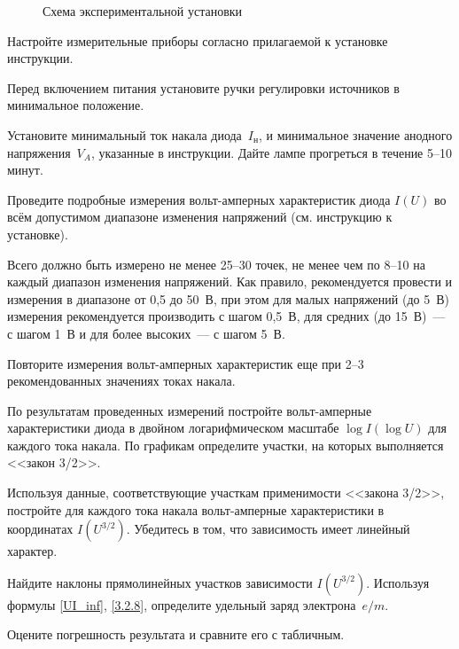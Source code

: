 \begin{figure}[h!]
    \centering
    \caption{Схема экспериментальной установки}
\end{figure}

\begin{lab:task}



    
\item Настройте измерительные приборы согласно прилагаемой к установке
инструкции.

\item Перед включением питания установите ручки регулировки источников
в минимальное положение.

\item Установите минимальный ток накала диода~$I_\text{н}$, 
и минимальное значение анодного напряжения~$V_{A}$, 
указанные в инструкции. Дайте лампе прогреться в течение 5--10 минут.

\item Проведите подробные измерения вольт-амперных характеристик диода 
$I(U)$ во всём допустимом диапазоне изменения напряжений  (см. инструкцию
к установке). 

Всего должно быть измерено не менее 25--30 точек, 
не менее чем по 8--10 на каждый диапазон изменения напряжений. 
Как правило, рекомендуется провести и измерения в диапазоне от 0,5 до 50~В, 
при этом для малых напряжений (до 5~В) измерения рекомендуется производить 
с шагом 0,5~В, для средних (до 15~В)~--- с шагом 1~В и 
для более высоких~--- с шагом 5~В.

\item Повторите измерения вольт-амперных характеристик 
еще при 2--3 рекомендованных значениях токах накала.


\item По результатам проведенных измерений постройте 
вольт-амперные характеристики диода 
в двойном логарифмическом масштабе
$\log I (\log U)$
для каждого тока накала. По графикам определите участки, на которых
выполняется <<закон 3/2>>.

\item Используя данные, соответствующие участкам применимости
<<закона 3/2>>, постройте для каждого тока накала вольт-амперные 
характеристики в координатах $I(U^{3/2})$. 
Убедитесь в том, что зависимость имеет линейный характер. 

\item Найдите наклоны прямолинейных участков зависимости
$I(U^{3/2})$. Используя формулы \eqref{UI_inf}, \eqref{3.2.8}, 
определите удельный заряд электрона~$e/m$.

\item Оцените погрешность результата и сравните его с табличным.

\end{lab:task}


